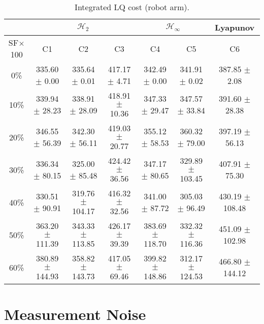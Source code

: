 \begin{table}[H]
\centering
\scriptsize
\begin{tabular}{| c || c | c | c | c | c | c |}
	\hline
	 & \multicolumn{3}{c|}{$\mathcal{H}_{2}$} & \multicolumn{2}{c|}{$\mathcal{H}_{\infty}$} & Lyapunov\\
	\hline
	SF$\times$100 & C1& C2 & C3 & C4 & C5 & C6\\
	\hline\hline
	0\% & 335.60 $\pm$ 0.00 & 335.64 $\pm$ 0.01 & 417.17 $\pm$ 4.71 & 342.49 $\pm$ 0.00 & 341.91 $\pm$ 0.02 & 387.85 $\pm$ 2.08\\
	\hline
	10\% & 339.94 $\pm$ 28.23 & 338.91 $\pm$ 28.09 & 418.91 $\pm$ 10.36 & 347.33 $\pm$ 29.47 & 347.57 $\pm$ 33.84 & 391.60 $\pm$ 28.38\\
	\hline
	20\% & 346.55 $\pm$ 56.39 & 342.30 $\pm$ 56.11 & 419.03 $\pm$ 20.77 & 355.12 $\pm$ 58.53 & 360.32 $\pm$ 79.00 & 397.19 $\pm$ 56.13\\
	\hline
	30\% & 336.34 $\pm$ 80.15 & 325.00 $\pm$ 85.48 & 424.42 $\pm$ 36.56 & 347.17 $\pm$ 80.65 & 329.89 $\pm$ 103.45 & 407.91 $\pm$ 75.30\\
	\hline
	40\% & 330.51 $\pm$ 90.91 & 319.76 $\pm$ 104.17 & 416.32 $\pm$ 32.56 & 341.00 $\pm$ 87.72 & 305.03 $\pm$ 96.49 & 430.19 $\pm$ 108.48\\
	\hline
	50\% & 363.20 $\pm$ 111.39 & 343.33 $\pm$ 113.85 & 426.17 $\pm$ 39.39 & 383.69 $\pm$ 118.70 & 332.32 $\pm$ 116.36 & 451.09 $\pm$ 102.98\\
	\hline
	60\% & 380.89 $\pm$ 144.93 & 358.82 $\pm$ 143.73 & 417.05 $\pm$ 69.46 & 399.82 $\pm$ 148.86 & 312.17 $\pm$ 124.53 & 466.80 $\pm$ 144.12\\
	\hline
\end{tabular}
\caption{Integrated LQ cost (robot arm).}
\label{table:lq_cost_robot_arm:unc}
\end{table}


\chapter{Measurement Noise}
\label{appendix:testResultsNoise}
